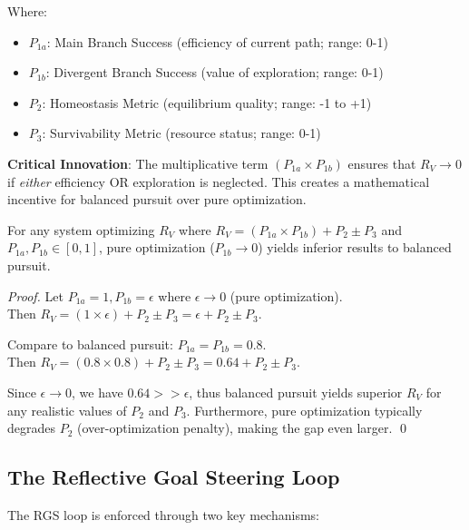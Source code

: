 \documentclass{article}
\begin{document}
Where:
\begin{itemize}
    \item $P_{1a}$: Main Branch Success (efficiency of current path; range: 0-1)
    \item $P_{1b}$: Divergent Branch Success (value of exploration; range: 0-1)
    \item $P_2$: Homeostasis Metric (equilibrium quality; range: -1 to +1)
    \item $P_3$: Survivability Metric (resource status; range: 0-1)
\end{itemize}

\textbf{Critical Innovation}: The multiplicative term $(P_{1a} \times P_{1b})$ ensures that $R_V \rightarrow 0$ if \textit{either} efficiency OR exploration is neglected. This creates a mathematical incentive for balanced pursuit over pure optimization.

\begin{theorem}
For any system optimizing $R_V$ where $R_V = (P_{1a} \times P_{1b}) + P_2 \pm P_3$ and $P_{1a}, P_{1b} \in [0,1]$, pure optimization ($P_{1b} \rightarrow 0$) yields inferior results to balanced pursuit.
\end{theorem}

\begin{proof}
Let $P_{1a} = 1, P_{1b} = \epsilon$ where $\epsilon \rightarrow 0$ (pure optimization). \\
Then $R_V = (1 \times \epsilon) + P_2 \pm P_3 = \epsilon + P_2 \pm P_3$.

Compare to balanced pursuit: $P_{1a} = P_{1b} = 0.8$. \\
Then $R_V = (0.8 \times 0.8) + P_2 \pm P_3 = 0.64 + P_2 \pm P_3$.

Since $\epsilon \rightarrow 0$, we have $0.64 >> \epsilon$, thus balanced pursuit yields superior $R_V$ for any realistic values of $P_2$ and $P_3$. Furthermore, pure optimization typically degrades $P_2$ (over-optimization penalty), making the gap even larger. \qed
\end{proof}

\subsection{The Reflective Goal Steering Loop}

The RGS loop is enforced through two key mechanisms:
\end{document}
